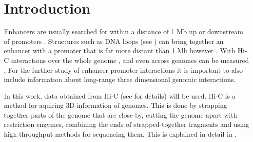 \chapter{Introduction}\label{chap:introduction}

%
%
%
%
%
%



Enhancers are usually searched for within a distance of 1 Mb up or downstream
of promoters \cite{pennacchio2013enhancers}. Structures such as DNA loops (see
) can bring together an enhancer with a promoter
that is far more distant than 1 Mb however \cite{pennacchio2013enhancers}. With
Hi-C interactions over the whole genome \cite{lieberman2009comprehensive}, and
even across genomes can be measured \cite{rao20143d}. For the further study of
enhancer-promoter interactions it is important to also include information
about long-range three dimensional genomic interactions.

In this work, data obtained from Hi-C (see  for
details) will be used. Hi-C is a method for aquiring 3D-information of genomes.
This is done by strapping together parts of the genome that are close by,
cutting the genome apart with restriction enzymes, combining the ends of
strapped-together fragments and using high throughput methods for sequencing
them. This is explained in detail in .


